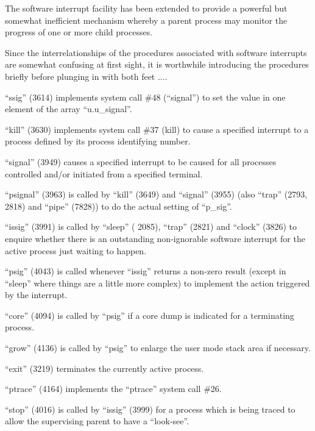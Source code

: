 
The software interrupt facility has
been extended to provide a powerful but
somewhat inefficient mechanism whereby
a parent process may monitor the progress of one or more child processes.


Since the interrelationships of the
procedures associated with software
interrupts are somewhat confusing at
first sight, it is worthwhile introducing the procedures briefly before
plunging in with both feet ....



``ssig'' (3614) implements system call
\#48 (``signal'') to set the value in one
element of the array ``u.u\_signal''.



``kill'' (3630) implements system call
\#37 (kill) to cause a specified
interrupt to a process defined by its
process identifying number.

``signal'' (3949) causes a specified
interrupt to be caused for all
processes controlled and/or initiated
from a specified terminal.


``psignal'' (3963) is called by ``kill''
(3649) and ``signal'' (3955) (also ``trap''
(2793, 2818) and ``pipe'' (7828)) to do
the actual setting of ``p\_sig''.



``issig'' (3991) is called by ``sleep''
( 2085), ``trap'' (2821) and ``clock''
(3826) to enquire whether there is an
outstanding non-ignorable software
interrupt for the active process just
waiting to happen.

``psig'' (4043) is called whenever
``issig'' returns a non-zero result
(except in ``sleep'' where things are a
little more complex) to implement the
action triggered by the interrupt.

``core'' (4094) is called by ``psig'' if a
core dump is indicated for a terminating process.

``grow'' (4136) is called by ``psig'' to
enlarge the user mode stack area if
necessary.

``exit'' (3219) terminates the currently
active process.


``ptrace'' (4164) implements the ``ptrace''
system call \#26.

``stop'' (4016) is called by ``issig''
(3999) for a process which is being
traced to allow the supervising parent
to have a ``look-see''.

